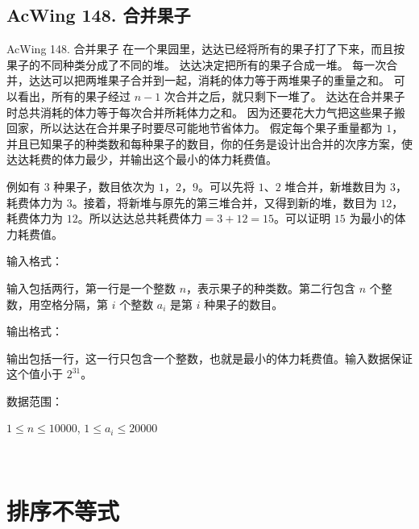 \subsection{AcWing 148. 合并果子}
\begin{titledbox}{AcWing 148. 合并果子}
    在一个果园里，达达已经将所有的果子打了下来，而且按果子的不同种类分成了不同的堆。 达达决定把所有的果子合成一堆。 每一次合并，达达可以把两堆果子合并到一起，消耗的体力等于两堆果子的重量之和。 可以看出，所有的果子经过 $n-1$ 次合并之后，就只剩下一堆了。 达达在合并果子时总共消耗的体力等于每次合并所耗体力之和。 因为还要花大力气把这些果子搬回家，所以达达在合并果子时要尽可能地节省体力。 假定每个果子重量都为 $1$，并且已知果子的种类数和每种果子的数目，你的任务是设计出合并的次序方案，使达达耗费的体力最少，并输出这个最小的体力耗费值。

    例如有 $3$ 种果子，数目依次为 $1，2，9$。可以先将 $1、2$ 堆合并，新堆数目为 $3$，耗费体力为 $3$。接着，将新堆与原先的第三堆合并，又得到新的堆，数目为 $12$，耗费体力为 $12$。所以达达总共耗费体力$=3+12=15$。可以证明 $15$ 为最小的体力耗费值。

    输入格式：

    输入包括两行，第一行是一个整数 $n$，表示果子的种类数。第二行包含 $n$ 个整数，用空格分隔，第 $i$ 个整数 $a_i$ 是第 $i$ 种果子的数目。

    输出格式：

    输出包括一行，这一行只包含一个整数，也就是最小的体力耗费值。输入数据保证这个值小于 $2^{31}$。

    数据范围：

    $1 \le n \le 10000$, $1 \le a_i \le 20000$

    \begin{inputblock}
         \\
    \end{inputblock}
    \begin{outputblock}
    \end{outputblock}
\end{titledbox}


\section{排序不等式}

